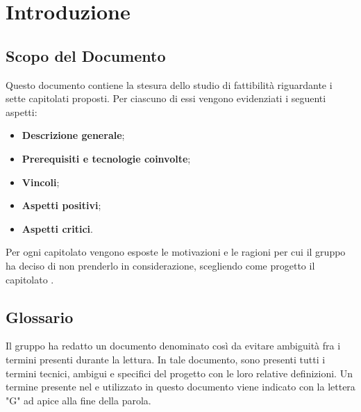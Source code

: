\section{Introduzione}
\subsection{Scopo del Documento}
Questo documento contiene la stesura dello studio di fattibilità riguardante i sette capitolati proposti. Per ciascuno di essi vengono evidenziati i seguenti aspetti:
\begin{itemize}
    \item \textbf{Descrizione generale};
    \item \textbf{Prerequisiti e tecnologie coinvolte};
    \item \textbf{Vincoli};
    \item \textbf{Aspetti positivi};
    \item \textbf{Aspetti critici}.
\end{itemize}
Per ogni capitolato vengono esposte le motivazioni e le ragioni per cui il gruppo ha deciso di non prenderlo in considerazione, scegliendo come progetto il capitolato \NomeProgetto{}.\\


\subsection{Glossario}
Il gruppo \Gruppo{} ha redatto un documento denominato  così da evitare ambiguità fra i termini presenti durante la lettura.
In tale documento, sono presenti tutti i termini tecnici, ambigui e specifici del progetto con le loro relative definizioni.
Un termine presente nel  e utilizzato in questo documento viene indicato con la lettera "G" ad apice alla fine della parola.


